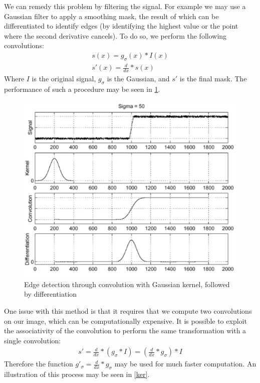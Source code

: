 \documentclass[twoside]{article}
\begin{document}
We can remedy this problem by filtering the signal. For example we may use a Gaussian filter to apply a smoothing mask, the result of which can be differentiated to identify edges (by identifying the highest value or the point where the second derivative cancels). To do so, we perform the following convolutions:
\begin{gather*}
s(x)=g_\sigma(x) * I(x)\\
s'(x)=\frac{d}{dx} * s(x)
\end{gather*}
Where $I$ is the original signal, $g_\sigma$ is the Gaussian, and $s'$ is the final mask. The performance of such a procedure may be seen in \ref{gauss}.

\begin{figure}[h]
	\centering
	\includegraphics[scale=.4]{gaussian.PNG}
    \caption{Edge detection through convolution with Gaussian kernel, followed by differentiation}
    \label{gauss}
\end{figure}

One issue with this method is that it requires that we compute two convolutions on our image, which can be computationally expensive. It is possible to exploit the associativity of the convolution to perform the same transformation with a single convolution:
\begin{gather*}
s'=\frac{d}{dx} * (g_\sigma * I)=(\frac{d}{dx} * g_\sigma) * I
\end{gather*}
Therefore the function $g'_\sigma=\frac{d}{dx} * g_\sigma$ may be used for much faster computation. An illustration of this process may be seen in \ref{ker}.
\end{document}
